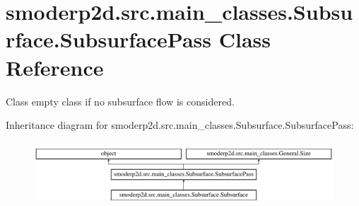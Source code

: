 \hypertarget{classsmoderp2d_1_1src_1_1main__classes_1_1Subsurface_1_1SubsurfacePass}{\section{smoderp2d.\-src.\-main\-\_\-classes.\-Subsurface.\-Subsurface\-Pass Class Reference}
\label{classsmoderp2d_1_1src_1_1main__classes_1_1Subsurface_1_1SubsurfacePass}
}


Class empty class if no subsurface flow is considered.  


Inheritance diagram for smoderp2d.\-src.\-main\-\_\-classes.\-Subsurface.\-Subsurface\-Pass\-:\begin{figure}[H]
\begin{center}
\leavevmode
\includegraphics[height=2.413793cm]{d9/d6d/classsmoderp2d_1_1src_1_1main__classes_1_1Subsurface_1_1SubsurfacePass}
\end{center}
\end{figure}
